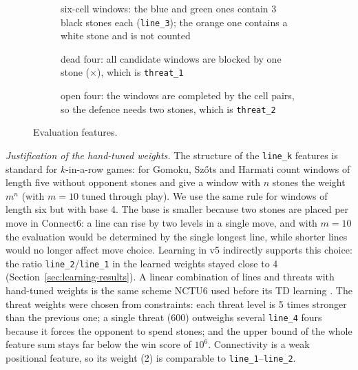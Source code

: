 \documentclass[a4paper,10pt,twocolumn]{article}
\newcommand{\code}[1]{\texttt{#1}}
\newcommand{\board}[4]{%
  \fill[board] (#1-0.6,-#3+0.6) rectangle (#2+0.6,-#4-0.6);
  \foreach \c in {#1,...,#2} {\draw[black!60,line width=0.3pt] (\c,-#3) -- (\c,-#4);
     \node[font=\tiny\ttfamily,above] at (\c,-#3+0.45) {\pgfmathparse{int(\c+64)}\char\pgfmathresult};}
  \foreach \r in {#3,...,#4} {\draw[black!60,line width=0.3pt] (#1,-\r) -- (#2,-\r);
     \node[font=\tiny\ttfamily,left] at (#1-0.45,-\r) {\pgfmathparse{int(\r+64)}\char\pgfmathresult};}
}
\newcommand{\B}[2]{\node[bstone] at (#1,-#2) {};}
\newcommand{\W}[2]{\node[wstone] at (#1,-#2) {};}
\begin{document}
\begin{figure}[t]
\centering
\begin{subfigure}[t]{0.36\textwidth}\centering
{}
\caption{six-cell windows: the blue and green ones contain 3 black stones each (\code{line\_3}); the orange one contains a white stone and is not counted}
\end{subfigure}\hfill
\begin{subfigure}[t]{0.28\textwidth}\centering
{}
\caption{dead four: all candidate windows are blocked by one stone ($\times$), which is \code{threat\_1}}
\end{subfigure}\hfill
\begin{subfigure}[t]{0.30\textwidth}\centering
{}
\caption{open four: the windows are completed by the cell pairs, so the defence needs two stones, which is \code{threat\_2}}
\end{subfigure}
\caption{Evaluation features.}
\label{fig:features}
\end{figure}

\emph{Justification of the hand-tuned weights.} The structure of the \code{line\_k} features is standard for $k$-in-a-row games: for Gomoku, Szőts and Harmati \citeyearpar{szots2018gomoku} count windows of length five without opponent stones and give a window with $n$ stones the weight $m^n$ (with $m=10$ tuned through play). We use the same rule for windows of length six but with base 4. The base is smaller because two stones are placed per move in Connect6: a line can rise by two levels in a single move, and with $m=10$ the evaluation would be determined by the single longest line, while shorter lines would no longer affect move choice. Learning in v5 indirectly supports this choice: the ratio \code{line\_2}/\code{line\_1} in the learned weights stayed close to 4 (Section~\ref{sec:learning-results}). A linear combination of lines and threats with hand-tuned weights is the same scheme NCTU6 used before its TD learning \citep{wu2012td}. The threat weights were chosen from constraints: each threat level is 5 times stronger than the previous one; a single threat (600) outweighs several \code{line\_4} fours because it forces the opponent to spend stones; and the upper bound of the whole feature sum stays far below the win score of $10^6$. Connectivity is a weak positional feature, so its weight (2) is comparable to \code{line\_1}--\code{line\_2}.
\end{document}
